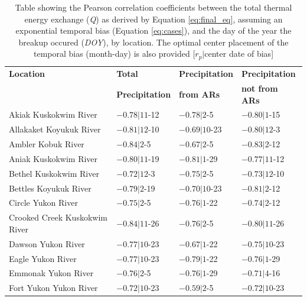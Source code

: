 \documentclass[12pts,draft]{AR_analysis_}
\begin{document}
\begin{table}[h]  %
    \centering  %
    \caption{Table showing the Pearson correlation coefficients 
    between the total thermal energy exchange (\emph{Q}) as derived by Equation
    \ref{eq:final_eq}, assuming an exponential temporal bias (Equation 
    \ref{eq:cases}), and the day of the year the breakup occured (\emph{DOY}),
    by location. The optimal center placement of the temporal bias (month-day) 
    is also provided [$r_{p}|$center date of bias]}  %
    \label{tab:pearson}  %
    
    \begin{tabular}{llll}
    \toprule
    \textbf{Location} & \textbf{Total} & \textbf{Precipitation} & \textbf{Precipitation} \\
    \textbf{} & \textbf{Precipitation} & \textbf{from ARs} & \textbf{not from ARs} \\
    \midrule
	Akiak Kuskokwim River         &  $-0.78|11$-12 &  $-0.78|2$-5 &    $-0.80|1$-15 \\
	Allakaket Koyukuk River       &  $-0.81|12$-10 &  $-0.69|10$-23 &  $-0.80|12$-3 \\
	Ambler Kobuk River            &  $-0.84|2$-5 &    $-0.67|2$-5 &    $-0.83|2$-12 \\
	Aniak Kuskokwim River         &  $-0.80|11$-19 &  $-0.81|1$-29 &   $-0.77|11$-12 \\
	Bethel Kuskokwim River        &  $-0.72|12$-3 &   $-0.75|2$-5 &    $-0.73|12$-10 \\
	Bettles Koyukuk River         &  $-0.79|2$-19 &   $-0.70|10$-23 &  $-0.81|2$-12 \\
	Circle Yukon River            &  $-0.75|2$-5 &    $-0.76|1$-22 &   $-0.74|2$-12 \\
	Crooked Creek Kuskokwim River &  $-0.84|11$-26 &  $-0.76|2$-5 &    $-0.80|11$-26 \\
	Dawson Yukon River            &  $-0.77|10$-23 &  $-0.67|1$-22 &   $-0.75|10$-23 \\
	Eagle Yukon River             &  $-0.77|10$-23 &  $-0.79|1$-22 &   $-0.76|1$-29 \\
	Emmonak Yukon River           &  $-0.76|2$-5 &    $-0.76|1$-29 &   $-0.71|4$-16 \\
	Fort Yukon Yukon River        &  $-0.72|10$-23 &  $-0.59|2$-5 &    $-0.72|10$-23 \\

\end{tabular}
\end{table}
\end{document}
